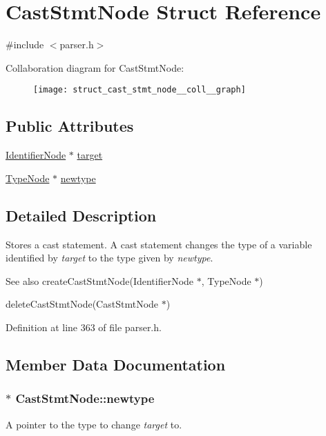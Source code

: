 \hypertarget{struct_cast_stmt_node}{\section{Cast\-Stmt\-Node Struct Reference}
\label{struct_cast_stmt_node}
}


{\ttfamily \#include $<$parser.\-h$>$}



Collaboration diagram for Cast\-Stmt\-Node\-:
\nopagebreak
\begin{figure}[H]
\begin{center}
\leavevmode
\texttt{[image: struct\_cast\_stmt\_node\_\_coll\_\_graph]}
\end{center}
\end{figure}
\subsection*{Public Attributes}
\begin{DoxyCompactItemize}
\item 
\hyperlink{struct_identifier_node}{Identifier\-Node} $\ast$ \hyperlink{struct_cast_stmt_node_a89d56358f0a8fc4d4fb0df7029ea494e}{target}
\item 
\hyperlink{struct_type_node}{Type\-Node} $\ast$ \hyperlink{struct_cast_stmt_node_adbeebc6cefa4f2cb92079b82cb4f4df8}{newtype}
\end{DoxyCompactItemize}


\subsection{Detailed Description}
Stores a cast statement. A cast statement changes the type of a variable identified by {\itshape target\/} to the type given by {\itshape newtype\/}.

\begin{DoxySeeAlso}{See also}
create\-Cast\-Stmt\-Node(\-Identifier\-Node $\ast$, Type\-Node $\ast$) 

delete\-Cast\-Stmt\-Node(\-Cast\-Stmt\-Node $\ast$) 
\end{DoxySeeAlso}


Definition at line 363 of file parser.\-h.



\subsection{Member Data Documentation}
\hypertarget{struct_cast_stmt_node_adbeebc6cefa4f2cb92079b82cb4f4df8}{
\subsubsection[{newtype}]{$\ast$ {\bf Cast\-Stmt\-Node\-::newtype}}}\label{struct_cast_stmt_node_adbeebc6cefa4f2cb92079b82cb4f4df8}
A pointer to the type to change {\itshape target\/} to. 

